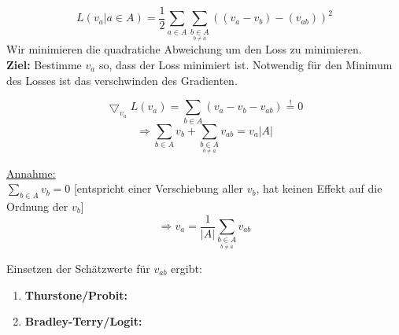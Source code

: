 $$L(v_a | a \in A) = \dfrac{1}{2} \sum_{a \in A}\sum_{\underset{b \neq a}{b \in A}}((v_a - v_b)-(v_{ab}))^2$$
Wir minimieren die quadratiche Abweichung um den Loss zu minimieren.\\
\textbf{Ziel:} Bestimme $v_a$ so, dass der Loss minimiert ist. Notwendig für den Minimum des Losses ist das verschwinden des Gradienten.

$$\bigtriangledown_{v_a}L(v_a) =  \sum_{b \in A}(v_a - v_b - v_{ab}) \overset{!}{=} 0$$
$$\Rightarrow  \sum_{b \in A}v_b + \sum_{\underset{b \neq a}{b \in A}}v_{ab} = v_a |A|$$

\underline{Annahme:} \\$ \sum_{b \in A}v_b = 0$ [entspricht einer Verschiebung aller $v_b$, hat keinen Effekt auf die Ordnung der $v_b$]\\
$$\Rightarrow v_a = \dfrac{1}{|A|} \sum_{\underset{b \neq a}{b \in A}} v_{ab}$$

Einsetzen der Schätzwerte für $v_{ab}$ ergibt:
\begin{enumerate}
\item \textbf{Thurstone/Probit:}\\



\item \textbf{Bradley-Terry/Logit:}\\


\end{enumerate}

